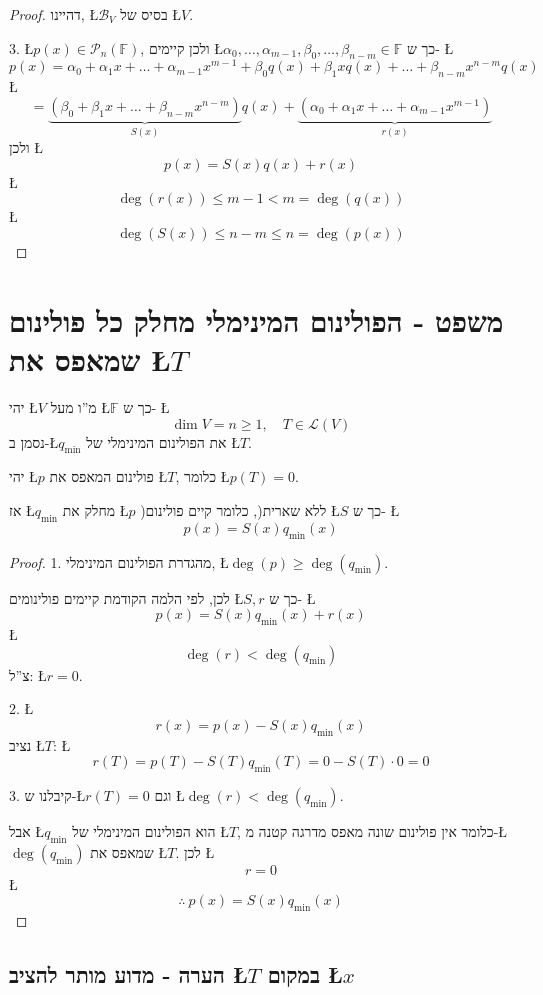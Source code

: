 \documentclass[english,hebrew]{article}
\begin{document}
\begin{proof}
דהיינו, \L{$\mathcal{B}_{V}$} בסיס של \L{$V$}.

3. \L{$p(x)\in\mathcal{P}_{n}(\mathbb{F})$}, ולכן קיימים \L{$\alpha_{0},\dots,\alpha_{m-1},\beta_{0},\dots,\beta_{n-m}\in\mathbb{F}$}
כך ש- \L{%
\[
p(x)=\alpha_{0}+\alpha_{1}x+\dots+\alpha_{m-1}x^{m-1}+\beta_{0}q(x)+\beta_{1}xq(x)+\dots+\beta_{n-m}x^{n-m}q(x)
\]
}%
\L{%
\[
=\underbrace{\left(\beta_{0}+\beta_{1}x+\dots+\beta_{n-m}x^{n-m}\right)}_{S(x)}q(x)+\underbrace{\left(\alpha_{0}+\alpha_{1}x+\dots+\alpha_{m-1}x^{m-1}\right)}_{r(x)}
\]
}%
ולכן \L{%
\[
p(x)=S(x)q(x)+r(x)
\]
}%
\L{%
\[
\deg\left(r(x)\right)\leq m-1<m=\deg\left(q(x)\right)
\]
}%
\L{%
\[
\deg\left(S(x)\right)\le n-m\le n=\deg\left(p(x)\right)
\]
}%
\end{proof}

\section{משפט - הפולינום המינימלי מחלק כל פולינום שמאפס את \L{$T$}}

יהי \L{$V$} מ\textquotedblright ו מעל \L{$\mathbb{F}$} כך ש- \L{%
\[
\dim V=n\geq1,\quad T\in\mathcal{L}(V)
\]
}%
נסמן ב-\L{$q_{\min}$} את הפולינום המינימלי של \L{$T$}.

יהי \L{$p$} פולינום המאפס את \L{$T$}, כלומר \L{$p(T)=0$}.

אז \L{$q_{\min}$} מחלק את \L{$p$} )ללא שארית(, כלומר קיים פולינום
\L{$S$} כך ש- \L{%
\[
p(x)=S(x)q_{\min}(x)
\]
}%

\begin{proof}
1. מהגדרת הפולינום המינימלי, \L{$\deg\left(p\right)\ge\deg\left(q_{\text{min}}\right)$}.

לכן, לפי הלמה הקודמת קיימים פולינומים \L{$S,r$} כך ש- \L{%
\[
p(x)=S(x)q_{\min}(x)+r(x)
\]
}%
\L{%
\[
\deg(r)<\deg(q_{\min})
\]
}%
צ\textquotedblright ל: \L{$r=0$}.

2. \L{%
\[
r(x)=p(x)-S(x)q_{\min}(x)
\]
}%
נציב \L{$T$}: \L{%
\[
r(T)=p(T)-S(T)q_{\min}(T)=0-S(T)\cdot0=0
\]
}%

3. קיבלנו ש-\L{$r(T)=0$} וגם \L{$\deg(r)<\deg(q_{\min})$}. 

אבל \L{$q_{\min}$} הוא הפולינום המינימלי של \L{$T$}, כלומר אין פולינום
שונה מאפס מדרגה קטנה מ-\L{$\deg(q_{\min})$} שמאפס את \L{$T$}. לכן
\L{%
\[
r=0
\]
}%
\L{%
\[
\therefore\ p(x)=S(x)q_{\min}(x)
\]
}%
\end{proof}

\subsection{הערה - מדוע מותר להציב \L{$T$} במקום \L{$x$}}
\end{document}
